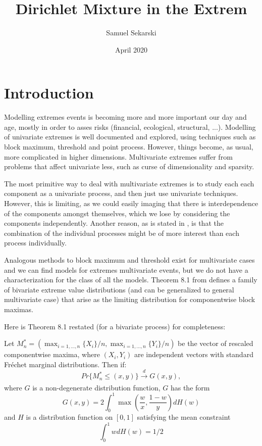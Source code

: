 \documentclass[10pt]{report}
\title{Dirichlet Mixture in the Extrem}
\author{Samuel Sekarski}
\date{April 2020}
\begin{document}
\maketitle



\tableofcontents

\chapter{Introduction}

Modelling extremes events is becoming more and more important our day and age, mostly in order to asses risks (financial, ecological, structural, ...). Modelling of univariate extremes is well documented and explored, using techniques such as block maximum, threshold and point process.
However, things become, as usual, more complicated in higher dimensions. Multivariate extremes suffer from problems that affect univariate less, such as curse of dimensionality and sparsity.

The most primitive way to deal with multivariate extremes is to study each each component as a univariate process, and then just use univariate techniques. However, this is limiting, as we could easily imaging that there is interdependence of the components amongst themselves, which we lose by considering the components independently. Another reason, as is stated in \cite{Coles}, is that the combination of the individual processes might be of more interest than each process individually.

Analogous methods to block maximum and threshold exist for multivariate cases and we can find models for extremes multivariate events, but we do not have a characterization for the class of all the models. Theorem 8.1 from \cite{Coles} defines a family of bivariate extreme value distributions (and can be generalized to general multivariate case) that arise as the limiting distribution for componentwise block maximas. 

Here is Theorem 8.1 restated (for a bivariate process) for completeness:

Let $M^*_n = (\max_{i=1,...,n} \{X_i\}/n, \max_{i=1,...,n} \{Y_i\}/n)$ be the vector of rescaled componentwise maxima, where $(X_i,Y_i)$ are independent vectors with standard Fréchet marginal distributions. Then if:
$$
Pr\{M^*_n \leq (x,y) \} \xrightarrow[]{d} G(x,y),
$$
where $G$ is a non-degenerate distribution function, $G$ has the form
$$
G(x,y) = 2 \int^1_0 \max (\frac{w}{x},\frac{1-w}{y})dH(w)
$$
and $H$ is a distribution function on $[0,1]$ satisfying the mean constraint
$$
\int_0^1 wdH(w) = 1/2
$$
\end{document}
